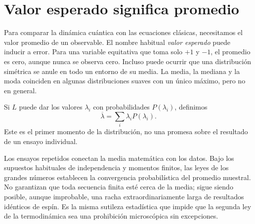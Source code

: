 \section{Valor esperado significa promedio}

Para comparar la dinámica cuántica con las ecuaciones clásicas, necesitamos el valor promedio de un observable. El nombre habitual \emph{valor esperado} puede inducir a error. Para una variable equitativa que toma solo \(+1\) y \(-1\), el promedio es cero, aunque nunca se observa cero. Incluso puede ocurrir que una distribución simétrica se anule en todo un entorno de su media. La media, la mediana y la moda coinciden en algunas distribuciones suaves con un único máximo, pero no en general.

Si \(L\) puede dar los valores \(\lambda_i\) con probabilidades \(P(\lambda_i)\), definimos
\begin{equation}
\overline{\lambda}=\sum_i\lambda_iP(\lambda_i).
\label{eq:l4-probability-average}
\end{equation}
Este es el primer momento de la distribución, no una promesa sobre el resultado de un ensayo individual.

\begin{classroomqa}
\end{classroomqa}

Los ensayos repetidos conectan la media matemática con los datos. Bajo los supuestos habituales de independencia y momentos finitos, las leyes de los grandes números establecen la convergencia probabilística del promedio muestral. No garantizan que toda secuencia finita esté cerca de la media; sigue siendo posible, aunque improbable, una racha extraordinariamente larga de resultados idénticos de espín. Es la misma sutileza estadística que impide que la segunda ley de la termodinámica sea una prohibición microscópica sin excepciones.

\begin{classroomqa}
\end{classroomqa}

